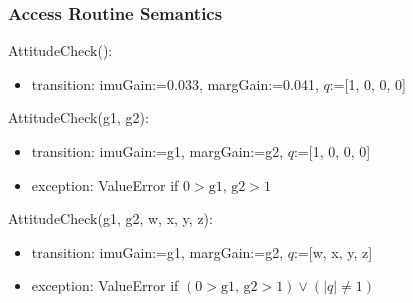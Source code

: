 \documentclass[12pt, titlepage]{article}
\begin{document}
\subsubsection{Access Routine Semantics}

\noindent AttitudeCheck():
\begin{itemize}
\item transition: imuGain:=0.033, margGain:=0.041, $q$:=[1, 0, 0, 0]
\end{itemize}

\noindent AttitudeCheck(g1, g2):
\begin{itemize}
\item transition: imuGain:=g1, margGain:=g2, $q$:=[1, 0, 0, 0]
\item exception: ValueError if $0 > \text{g1, g2} > 1$
\end{itemize}

\noindent AttitudeCheck(g1, g2, w, x, y, z):
\begin{itemize}
\item transition: imuGain:=g1, margGain:=g2, $q$:=[w, x, y, z]
\item exception: ValueError if $(0 > \text{g1, g2} > 1) \vee (|q| \neq 1)$
\end{itemize}
\end{document}
